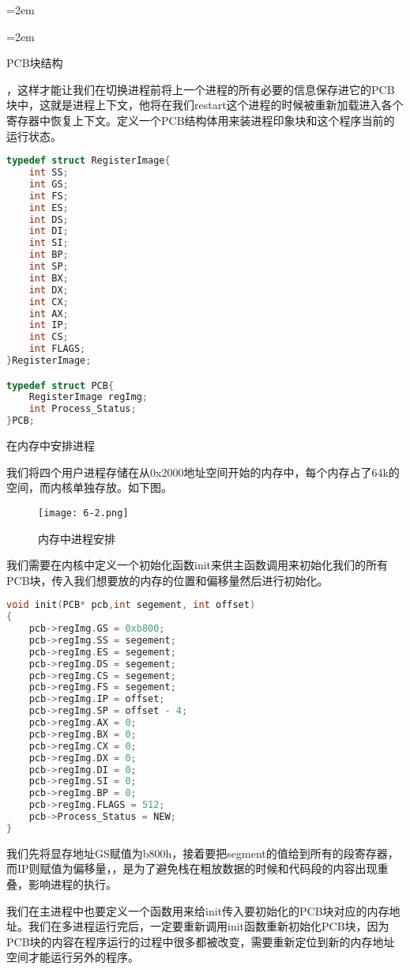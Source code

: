 \documentclass[UTF8]{article}
\newcommand{\red}{\color{red}}
\begin{document}
\parindent=2em %
\begin{enumerate}[1)]
	\parindent=2em
	{\bfseries\item PCB块结构}
，这样才能让我们在切换进程前将上一个进程的所有必要的信息保存进它的PCB块中，这就是进程上下文，他将在我们restart这个进程的时候被重新加载进入各个寄存器中恢复上下文。定义一个PCB结构体用来装进程印象块和这个程序当前的运行状态。
	\begin{lstlisting}[language={C}]
typedef struct RegisterImage{
	int SS;
	int GS;
	int FS;
	int ES;
	int DS;
	int DI;
	int SI;
	int BP;
	int SP;
	int BX;
	int DX;
	int CX;
	int AX;
	int IP;
	int CS;
	int FLAGS;
}RegisterImage;

typedef struct PCB{
	RegisterImage regImg;
	int Process_Status;
}PCB;
	\end{lstlisting}

{\bfseries\item 在内存中安排进程}
\par 我们将四个用户进程存储在从0x2000地址空间开始的内存中，每个内存占了64k的空间，而内核单独存放。如下图。
\begin{figure}[htbp]
			\centering
			\texttt{[image: 6-2.png]}
			\caption{内存中进程安排}
\end{figure}
\par
我们需要在内核中定义一个初始化函数init来供主函数调用来初始化我们的所有PCB块，传入我们想要放的内存的位置和偏移量然后进行初始化。
\begin{lstlisting}[language={C}]
void init(PCB* pcb,int segement, int offset)
{
	pcb->regImg.GS = 0xb800;
	pcb->regImg.SS = segement;
	pcb->regImg.ES = segement;
	pcb->regImg.DS = segement;
	pcb->regImg.CS = segement;
	pcb->regImg.FS = segement;
	pcb->regImg.IP = offset;
	pcb->regImg.SP = offset - 4;
	pcb->regImg.AX = 0;
	pcb->regImg.BX = 0;
	pcb->regImg.CX = 0;
	pcb->regImg.DX = 0;
	pcb->regImg.DI = 0;
	pcb->regImg.SI = 0;
	pcb->regImg.BP = 0;
	pcb->regImg.FLAGS = 512;
	pcb->Process_Status = NEW;
}
	\end{lstlisting}
\par 我们先将显存地址GS赋值为b800h，接着要把segment的值给到所有的段寄存器，而IP则赋值为偏移量，{，是为了避免栈在粗放数据的时候和代码段的内容出现重叠，影响进程的执行。}
\par 我们在主进程中也要定义一个函数用来给init传入要初始化的PCB块对应的内存地址。我们在多进程运行完后，一定要重新调用init函数重新初始化PCB块，因为PCB块的内容在程序运行的过程中很多都被改变，需要重新定位到新的内存地址空间才能运行另外的程序。


\end{enumerate}
\end{document}
